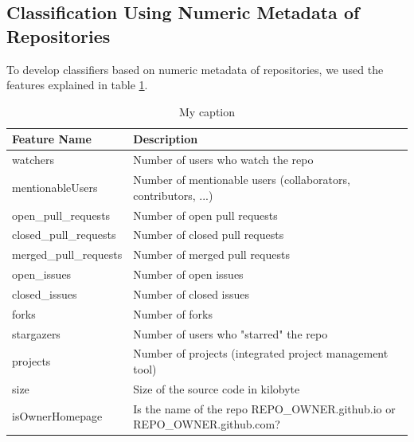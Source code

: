 \documentclass[%
a4paper,
DIV12,
2.5headlines,
bigheadings,
titlepage,
openbib,
]{scrartcl}
\begin{document}
\subsection{Classification Using Numeric Metadata of
Repositories}\label{classification-using-numeric-metadata-of-repositories}

To develop classifiers based on numeric metadata of repositories, we used the features explained in table \ref{features}.

\begin{table}[]
\centering
\caption{My caption}
\label{features}
\begin{tabularx}{\linewidth}{|l|X|}
\hline
Feature Name           & Description                                                                        \\ \hline
watchers               & Number of users who watch the repo                                                 \\ \hline
mentionableUsers       & Number of mentionable users (collaborators, contributors, ...)                     \\ \hline
open\_pull\_requests   & Number of open pull requests                                                       \\ \hline
closed\_pull\_requests & Number of closed pull requests                                                     \\ \hline
merged\_pull\_requests & Number of merged pull requests                                                     \\ \hline
open\_issues           & Number of open issues                                                              \\ \hline
closed\_issues         & Number of closed issues                                                            \\ \hline
forks                  & Number of forks                                                                    \\ \hline
stargazers             & Number of users who "starred" the repo                                             \\ \hline
projects               & Number of projects (integrated project management tool)                            \\ \hline
size                   & Size of the source code in kilobyte                                                \\ \hline
isOwnerHomepage        & Is the name of the repo REPO\_OWNER.github.io or REPO\_OWNER.github.com?         \\ \hline

\end{tabularx}
\end{table}
\end{document}

